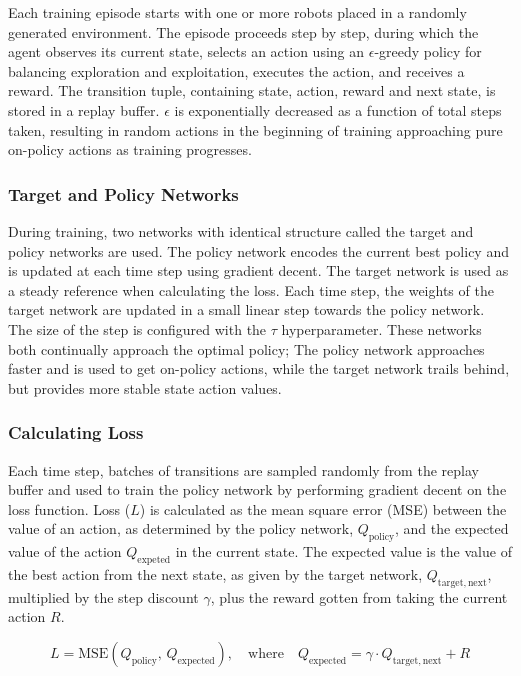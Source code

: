 Each training episode starts with one or more robots placed in a randomly generated environment. The episode proceeds step by step, during which the agent observes its current state, selects an action using an $\epsilon$-greedy policy for balancing exploration and exploitation, executes the action, and receives a reward. The transition tuple, containing state, action, reward and next state, is stored in a replay buffer. $\epsilon$ is exponentially decreased as a function of total steps taken, resulting in random actions in the beginning of training approaching pure on-policy actions as training progresses. \\

\subsubsection{Target and Policy Networks}
During training, two networks with identical structure called the target and policy networks are used. The policy network encodes the current best policy and is updated at each time step using gradient decent. The target network is used as a steady reference when calculating the loss. Each time step, the weights of the target network are updated in a small linear step towards the policy network. The size of the step is configured with the $\tau$ hyperparameter. These networks both continually approach the optimal policy; The policy network approaches faster and is used to get on-policy actions, while the target network trails behind, but provides more stable state action values.

\subsubsection{Calculating Loss}
Each time step, batches of transitions are sampled randomly from the replay buffer and used to train the policy network by performing gradient decent on the loss function. Loss ($L$) is calculated as the mean square error (MSE) between the value of an action, as determined by the policy network, $Q_\mathrm{policy}$, and the expected value of the action $Q_\mathrm{expeted}$ in the current state. The expected value is the value of the best action from the next state, as given by the target network, $Q_{\mathrm{target},\mathrm{next}}$, multiplied by the step discount $\gamma$, plus the reward gotten from taking the current action $R$.

\begin{equation}
    L = \mathrm{MSE}(Q_\mathrm{policy},\, Q_\mathrm{expected}), \quad \text{where}\quad
    Q_\mathrm{expected} = \gamma \cdot Q_{\mathrm{target},\mathrm{next}} + R
\end{equation}

